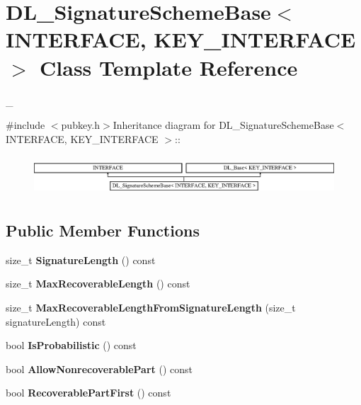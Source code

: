 \hypertarget{class_d_l___signature_scheme_base}{
\section{DL\_\-SignatureSchemeBase$<$ INTERFACE, KEY\_\-INTERFACE $>$ Class Template Reference}
\label{class_d_l___signature_scheme_base}
}


\_\-  


{\ttfamily \#include $<$pubkey.h$>$}Inheritance diagram for DL\_\-SignatureSchemeBase$<$ INTERFACE, KEY\_\-INTERFACE $>$::\begin{figure}[H]
\begin{center}
\leavevmode
\includegraphics[height=1.50134cm]{class_d_l___signature_scheme_base}
\end{center}
\end{figure}
\subsection*{Public Member Functions}
\begin{DoxyCompactItemize}
\item 
\hypertarget{class_d_l___signature_scheme_base_ad6ae2e613adb912c3860182a9cb027af}{
size\_\-t {\bfseries SignatureLength} () const }
\label{class_d_l___signature_scheme_base_ad6ae2e613adb912c3860182a9cb027af}

\item 
\hypertarget{class_d_l___signature_scheme_base_a248fb009c6bc306e3cf88b048e90a948}{
size\_\-t {\bfseries MaxRecoverableLength} () const }
\label{class_d_l___signature_scheme_base_a248fb009c6bc306e3cf88b048e90a948}

\item 
\hypertarget{class_d_l___signature_scheme_base_a0783f3f292fb2c1d66949cee5361ddcc}{
size\_\-t {\bfseries MaxRecoverableLengthFromSignatureLength} (size\_\-t signatureLength) const }
\label{class_d_l___signature_scheme_base_a0783f3f292fb2c1d66949cee5361ddcc}

\item 
\hypertarget{class_d_l___signature_scheme_base_ae87d7260e0768b1142cd7c9e8752296c}{
bool {\bfseries IsProbabilistic} () const }
\label{class_d_l___signature_scheme_base_ae87d7260e0768b1142cd7c9e8752296c}

\item 
\hypertarget{class_d_l___signature_scheme_base_a42afaadc73dcd76d0c0d1c11ae2c3619}{
bool {\bfseries AllowNonrecoverablePart} () const }
\label{class_d_l___signature_scheme_base_a42afaadc73dcd76d0c0d1c11ae2c3619}

\item 
\hypertarget{class_d_l___signature_scheme_base_a5ee403e1fa8a48911cb97abf5e584504}{
bool {\bfseries RecoverablePartFirst} () const }
\label{class_d_l___signature_scheme_base_a5ee403e1fa8a48911cb97abf5e584504}

\end{DoxyCompactItemize}
